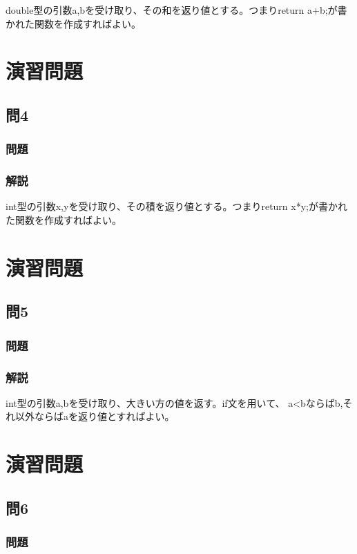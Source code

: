 double型の引数a,bを受け取り、その和を返り値とする。つまりreturn a+b;が書かれた関数を作成すればよい。

\section{演習問題}
\subsection{問4}
\subsubsection{問題}

\subsubsection{解説}

int型の引数x,yを受け取り、その積を返り値とする。つまりreturn x*y;が書かれた関数を作成すればよい。

\section{演習問題}
\subsection{問5}
\subsubsection{問題}

\subsubsection{解説}

int型の引数a,bを受け取り、大きい方の値を返す。if文を用いて、
a<bならばb,それ以外ならばaを返り値とすればよい。

\section{演習問題}
\subsection{問6}
\subsubsection{問題}


